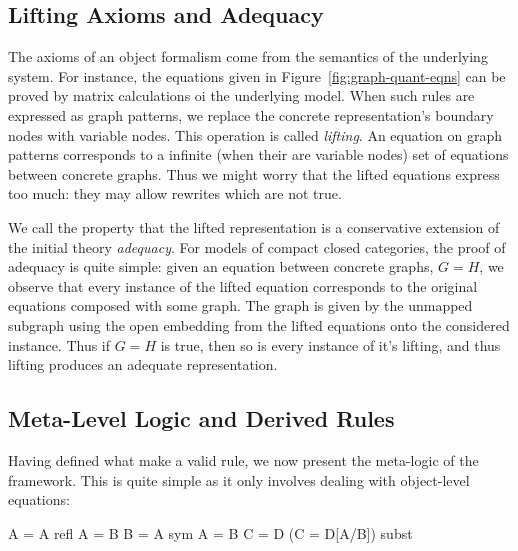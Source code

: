 \documentclass[runningheads]{llncs}
\begin{document}
\subsection{Lifting Axioms and Adequacy} 

The axioms of an object formalism come from the semantics of the
underlying system. For instance, the equations given in
Figure~\ref{fig:graph-quant-eqns} can be proved by matrix
calculations oi the underlying model. When such rules are expressed
as graph patterns, we replace the concrete representation's boundary
nodes with variable nodes. This operation is called \emph{lifting}. An
equation on graph patterns corresponds to a infinite (when their are
variable nodes) set of equations between concrete graphs. Thus we
might worry that the lifted equations express too much: they may allow
rewrites which are not true.

We call the property that the lifted representation is a conservative
extension of the initial theory \emph{adequacy}. For models of compact
closed categories, the proof of adequacy is quite simple: given an
equation between concrete graphs, $G = H$, we observe that every
instance of the lifted equation corresponds to the original equations
composed with some graph. The graph is given by the unmapped subgraph
using the open embedding from the lifted equations onto the considered
instance. Thus if $G = H$ is true, then so is every instance of it's
lifting, and thus lifting produces an adequate representation.

\subsection{Meta-Level Logic and Derived Rules}

Having defined what make a valid rule, we now present the meta-logic
of the framework. This is quite simple as it only involves dealing
with object-level equations:

\begin{center}
\prooftree
\justifies
\Gamma \vdash A = A
\using\mbox{refl}
\endprooftree 
\quad\quad
\prooftree
\Gamma \vdash A = B
\justifies
\Gamma \vdash B = A
\using\mbox{sym}
\endprooftree
\quad\quad
\prooftree
\Gamma \vdash A = B \quad\quad
\Gamma \vdash C = D
\justifies
\Gamma \vdash (C = D[A/B])
\using\mbox{subst}
\endprooftree
\end{center}
\end{document}
